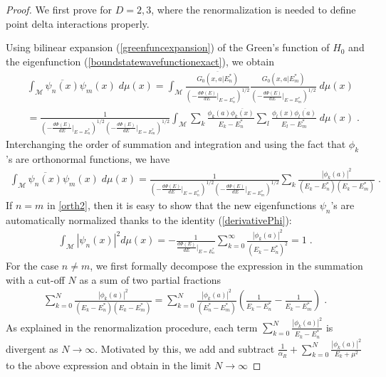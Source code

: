 \documentclass[10pt,a4paper]{amsart}
\begin{document}
\begin{proof} We first prove for $D=2,3$, where the renormalization is needed to define point delta interactions properly. 

Using bilinear expansion (\ref{greenfuncexpansion}) of the Green's function of $H_0$ and the eigenfunction (\ref{boundstatewavefunctionexact}), we obtain
%
\begin{eqnarray}
    & &  \int_{\mathcal{M}} \overline{\psi_n(x)} \psi_m (x) \; d\mu( x) =  \int_{\mathcal{M}} \frac{\overline{G_0(x,a|E_{n}^{*})}}{ \left(-\frac{d\Phi(E)}{d E}\bigg|_{E=E_{n}^{*}}\right)^{1/2}} \frac{G_0(x,a|E_{m}^{*})}{\left(-\frac{d \Phi(E)}{d E}\bigg|_{E=E_{m}^{*}}\right)^{1/2}}  \; d\mu(x) \nonumber \\  & & = \frac{1}{\left(-\frac{d \Phi(E)}{d E}\bigg|_{E=E_{n}^{*}}\right)^{1/2} \left(-\frac{d \Phi(E)}{d E}\bigg|_{E=E_{m}^{*}}\right)^{1/2}}\int_{\mathcal{M}} \sum_k \frac{\phi_k(a) \overline{\phi_k(x)}}{E_k-E_{n}^*}  \sum_l \frac{\phi_l(x) \overline{\phi_l(a)}}{E_l-E_{m}^*}  \; d\mu(x) \;.
\end{eqnarray}
%
Interchanging the order of summation and integration and using the fact that $\phi_k$'s are orthonormal functions, we have
%
\begin{eqnarray}
 \int_{\mathcal{M}} \overline{\psi_n(x)} \psi_m (x) \; d\mu( x) = \frac{1}{\left(-\frac{d \Phi(E)}{d E}\bigg|_{E=E_{n}^{*}}\right)^{1/2} \left(-\frac{d \Phi(E)}{d E}\bigg|_{E=E_{m}^{*}}\right)^{1/2}} \sum_k \frac{|\phi_k(a)|^2}{(E_k-E_{n}^*)(E_k-E_{m}^*)} \;. \label{orth2}
\end{eqnarray}
%
If $n=m$ in \ref{orth2}, then it is easy to show that the new eigenfunctions $\psi_n$'s are automatically normalized thanks to the identity (\ref{derivativePhi}):
%
\begin{eqnarray}
    \int_{\mathcal{M}}  |\psi_n(x)|^2 d\mu(x) = -\frac{1}{\frac{d \Phi(E)}{d E}\bigg|_{E=E_{n}^{*}}} \sum_{k=0}^{\infty} 
    \frac{|\phi_k(a)|^2}{(E_k-E_n^{*})^2} = 1 \;.
\end{eqnarray}
%
%
For the case $n \neq m$, we first formally decompose the expression in the summation with a cut-off $N$ as a sum of two partial fractions
%
\begin{eqnarray}
    \sum_{k=0}^{N} \frac{|\phi_k(a)|^2}{(E_k-E_{n}^*)(E_k-E_{m}^*)} =  \sum_{k=0}^{N} \frac{|\phi_k(a)|^2}{(E_{n}^{*}-E_{m}^*)} \left( \frac{1}{E_k-E_{n}^*}-\frac{1}{E_k-E_{m}^*}\right) \;.
\end{eqnarray}
%
As explained in the renormalization procedure, each term $\sum_{k=0}^{N} \frac{|\phi_k(a)|^2}{E_k-E_{n}^*}$ is divergent as $N \to \infty$. Motivated by this, we add and subtract $\frac{1}{\alpha_R} + \sum_{k=0}^{N} \frac{|\phi_k(a)|^2}{E_k + \mu^2}$ to the above expression and obtain in the limit $N \to \infty$

\end{proof}
\end{document}
